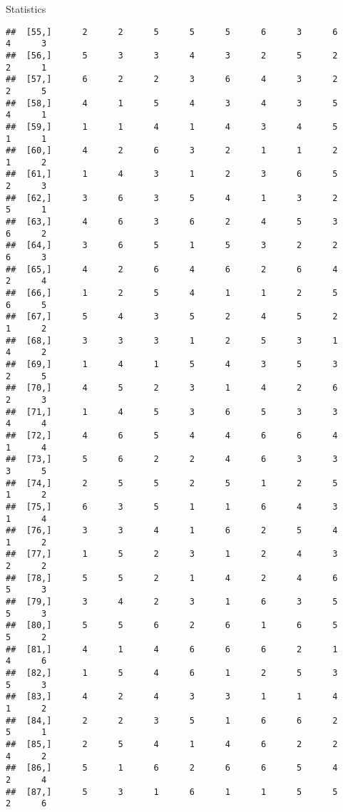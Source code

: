\documentclass[
  ignorenonframetext,
]{beamer}
\begin{document}
\begin{frame}[fragile]{Statistics}
\begin{verbatim}
##  [55,]      2      2      5      5      5      6      3      6      4      3
##  [56,]      5      3      3      4      3      2      5      2      2      1
##  [57,]      6      2      2      3      6      4      3      2      2      5
##  [58,]      4      1      5      4      3      4      3      5      4      1
##  [59,]      1      1      4      1      4      3      4      5      1      1
##  [60,]      4      2      6      3      2      1      1      2      1      2
##  [61,]      1      4      3      1      2      3      6      5      2      3
##  [62,]      3      6      3      5      4      1      3      2      5      1
##  [63,]      4      6      3      6      2      4      5      3      6      2
##  [64,]      3      6      5      1      5      3      2      2      6      3
##  [65,]      4      2      6      4      6      2      6      4      2      4
##  [66,]      1      2      5      4      1      1      2      5      6      5
##  [67,]      5      4      3      5      2      4      5      2      1      2
##  [68,]      3      3      3      1      2      5      3      1      4      2
##  [69,]      1      4      1      5      4      3      5      3      2      5
##  [70,]      4      5      2      3      1      4      2      6      2      3
##  [71,]      1      4      5      3      6      5      3      3      4      4
##  [72,]      4      6      5      4      4      6      6      4      1      4
##  [73,]      5      6      2      2      4      6      3      3      3      5
##  [74,]      2      5      5      2      5      1      2      5      1      2
##  [75,]      6      3      5      1      1      6      4      3      1      4
##  [76,]      3      3      4      1      6      2      5      4      1      2
##  [77,]      1      5      2      3      1      2      4      3      2      2
##  [78,]      5      5      2      1      4      2      4      6      5      3
##  [79,]      3      4      2      3      1      6      3      5      5      3
##  [80,]      5      5      6      2      6      1      6      5      5      2
##  [81,]      4      1      4      6      6      6      2      1      4      6
##  [82,]      1      5      4      6      1      2      5      3      5      3
##  [83,]      4      2      4      3      3      1      1      4      1      2
##  [84,]      2      2      3      5      1      6      6      2      5      1
##  [85,]      2      5      4      1      4      6      2      2      4      2
##  [86,]      5      1      6      2      6      6      5      4      2      4
##  [87,]      5      3      1      6      1      1      5      5      2      6

\end{verbatim}
\end{frame}
\end{document}
